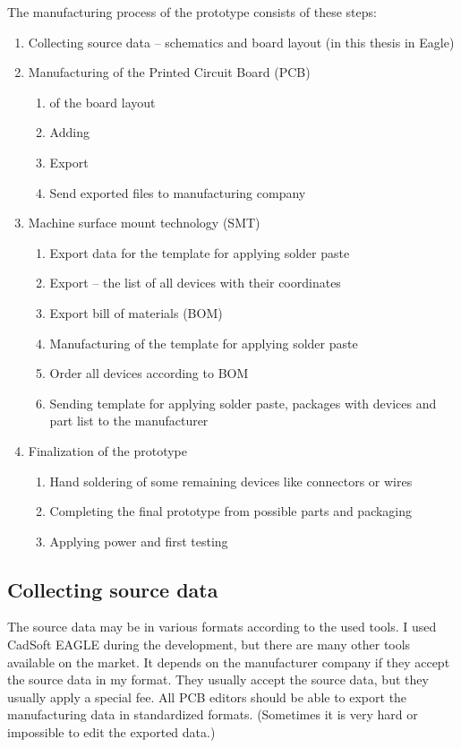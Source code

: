 The manufacturing process of the prototype consists of these steps:
\begin{enumerate}
    \item Collecting source data -- schematics and board layout (in this thesis in Eagle)
    \item Manufacturing of the Printed Circuit Board (\ac{PCB})
    \begin{enumerate}
        \item {} of the board layout
        \item Adding 
        \item Export 
        \item Send exported files to manufacturing company
    \end{enumerate}
    \item Machine surface mount technology (\ac{SMT})
    \begin{enumerate}
        \item Export data for the template for applying solder paste
        \item Export  -- the list of all devices with their coordinates
        \item Export bill of materials (\ac{BOM})
        \item Manufacturing of the template for applying solder paste
        \item Order all devices according to \ac{BOM}
        \item Sending template for applying solder paste, packages with devices and part list to the manufacturer
    \end{enumerate}
    \item Finalization of the prototype
    \begin{enumerate}
        \item Hand soldering of some remaining devices like connectors or wires
        \item Completing the final prototype from possible parts and packaging
        \item Applying power and first testing
    \end{enumerate}
\end{enumerate}

\subsection{Collecting source data}
The source data may be in various formats according to the used tools. I used CadSoft \ac{EAGLE} \cite{EAGLE} during the development, but there are many other tools available on the market. It depends on the manufacturer company if they accept the source data in my format. They usually accept the source data, but they usually apply a special fee. All \ac{PCB} editors should be able to export the manufacturing data in standardized formats. (Sometimes it is very hard or impossible to edit the exported data.)

